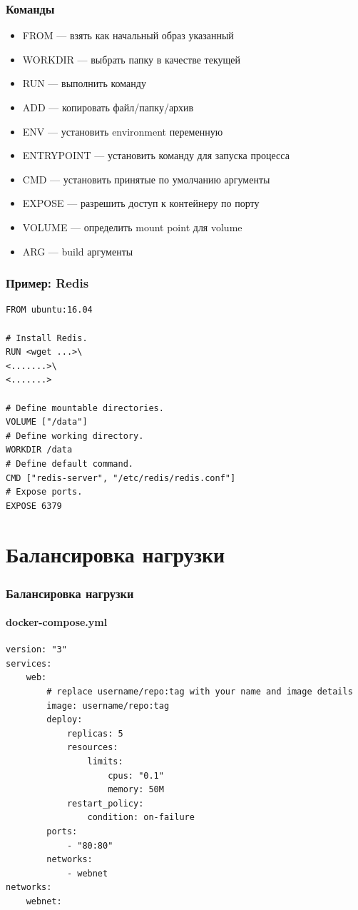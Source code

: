 \documentclass[xetex,mathserif,serif]{beamer}
\begin{document}
    \begin{frame}
        \frametitle{Команды}
        \begin{itemize}
            \item FROM --- взять как начальный образ указанный
            \item WORKDIR --- выбрать папку в качестве текущей
            \item RUN --- выполнить команду
            \item ADD --- копировать файл/папку/архив
            \item ENV --- установить environment переменную
            \item ENTRYPOINT --- установить команду для запуска процесса
            \item CMD --- установить принятые по умолчанию аргументы
            \item EXPOSE --- разрешить доступ к контейнеру по порту
            \item VOLUME --- определить mount point для volume
            \item ARG --- build аргументы
        \end{itemize}
    \end{frame}

    \begin{frame}[fragile]
        \frametitle{Пример: Redis}
        \begin{scriptsize}
            \begin{verbatim}
FROM ubuntu:16.04

# Install Redis.
RUN <wget ...>\
<.......>\
<.......>

# Define mountable directories.
VOLUME ["/data"]
# Define working directory.
WORKDIR /data
# Define default command.
CMD ["redis-server", "/etc/redis/redis.conf"]
# Expose ports.
EXPOSE 6379
            \end{verbatim}
        \end{scriptsize}
    \end{frame}

    \section{Балансировка нагрузки}

    \begin{frame}[fragile]
        \frametitle{Балансировка нагрузки}
        \framesubtitle{docker-compose.yml}
        \begin{scriptsize}
            \begin{verbatim}
version: "3"
services:
    web:
        # replace username/repo:tag with your name and image details
        image: username/repo:tag
        deploy:
            replicas: 5
            resources:
                limits:
                    cpus: "0.1"
                    memory: 50M
            restart_policy:
                condition: on-failure
        ports:
            - "80:80"
        networks:
            - webnet
networks:
    webnet:
            \end{verbatim}
        \end{scriptsize}
    \end{frame}
\end{document}
